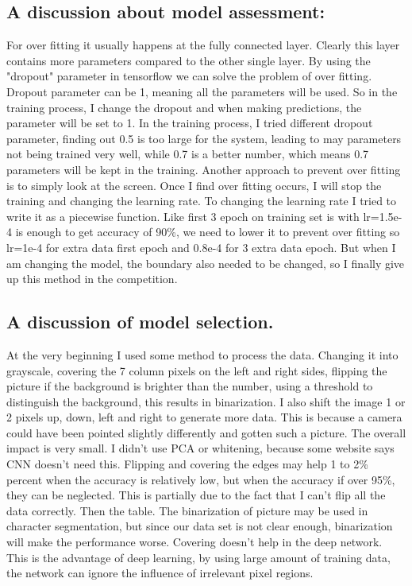 \documentclass[twocolumn]{webofc}
\begin{document}
\subsection{A discussion about model assessment:
}\label{sec:formatting}
For over fitting it usually happens at the fully connected layer. Clearly this layer contains more parameters compared to the other single layer. By using the "dropout\cite{Srivastava2014}" parameter in tensorflow we can solve the problem of over fitting. Dropout parameter can be 1, meaning all the parameters will be used.  So in the training process, I change the dropout and when making predictions, the parameter will be set to 1. In the training process, I tried different dropout parameter, finding out 0.5 is too large for the system, leading to may parameters not being trained very well, while 0.7 is a better number, which means 0.7 parameters will be kept in the training. 
Another approach to prevent over fitting is to simply look at the screen. Once I find over fitting occurs, I will stop the training and changing the learning rate. 
To changing the learning rate I tried to write it as a piecewise function. Like first 3 epoch on training set is with lr=1.5e-4 is enough to get accuracy of 90\%, we need to lower it to prevent over fitting so lr=1e-4 for extra data first epoch and 0.8e-4 for 3 extra data epoch. But when I am changing the model, the boundary also needed to be changed, so I finally give up this method in the competition. 
\subsection{A discussion of model selection.
}\label{sec:formatting}

 
At the very beginning I used some method to process the data. Changing it into grayscale, covering the 7 column pixels on the left and right sides, flipping the picture if the background is brighter than the number, using a threshold to distinguish the background, this results in binarization. I also shift the image 1 or 2 pixels up, down, left and right to generate more data. This is because a camera could have been pointed slightly differently and gotten such a picture. The overall impact is very small. I didn't use PCA or whitening, because some website says CNN doesn't need this. Flipping and covering the edges may help 1 to 2\% percent when the accuracy is relatively low, but when the accuracy if over 95\%, they can be neglected. This is partially due to the fact that I can't flip all the data correctly.
Then the table.
The binarization of picture may be used in character segmentation, but since our data set is not clear enough, binarization will make the performance worse. 
Covering doesn't help in the deep network. This is the advantage of deep learning, by using large amount of training data, the network can ignore the influence of irrelevant pixel regions.
\end{document}
